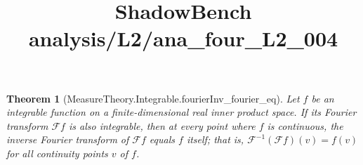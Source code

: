 \documentclass{article}
\title{ShadowBench analysis/L2/ana\_four\_L2\_004}
\newtheorem{theorem}{Theorem}
\begin{document}
\maketitle

\begin{theorem}[MeasureTheory.Integrable.fourierInv_fourier_eq] Let $f$ be an integrable function on a finite-dimensional real inner product space. If its Fourier transform $\mathcal{F} f$ is also integrable, then at every point where $f$ is continuous, the inverse Fourier transform of $\mathcal{F} f$ equals $f$ itself; that is, $\mathcal{F}^{-1}(\mathcal{F} f)(v) = f(v)$ for all continuity
 points $v$ of $f$.
\end{theorem}
\end{document}

